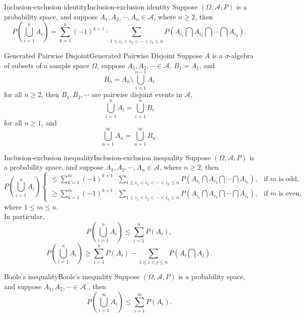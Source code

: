 \documentclass{elegantbook}
\newcommand\dis{\displaystyle}
\newcommand\ls{\leqslant}
\newcommand\gs{\geqslant}
\newcommand\sumin{\dis\sum\limits_{i=1}^{n}}
\newcommand\sumkfn{\dis\sum\limits_{k=1}^n}
\newcommand\ma{\mathcal{A}}
\begin{document}
\begin{theorem}{Inclusion-exclusion identity}{Inclusion-exclusion identity}
Suppose $(\Omega,\ma, P)$ is a probability space, and suppose $A_1,A_2,\cdots,A_n\in\ma $, where $n \gs2$, then $$P\left(\bigcup_{i=1}^n A_i \right)=\sumkfn(-1)^{k+1}\cdot  \sum_{1\ls i_1<i_2<\cdots<i_k\ls n}P\left(A_{i_1} \bigcap A_{i_2 } \bigcap\cdots\bigcap A_{i_k } \right) .$$

\end{theorem}

\begin{lemma}{Generated Pairwise Disjoint}{Generated Pairwise Disjoint}
Suppose $A$ is a $\sigma$-algebra of subsets of a sample space $\Omega$, suppose $A_1,A_2,\cdots\in\ma$, $B_1=A_1$, and $$B_n=A_n\setminus\bigcup_{i=1}^{n-1}A_i$$  for all $n\gs2$, then $B_1,B_2,\cdots$ are pairwise disjoint events in $\ma$, $$\bigcup_{i=1}^nA_i =\bigcup_{i=1}^nB_i$$  for all $n\gs1$, and $$\bigcup_{n=1}^\infty A_n =\bigcup_{n=1}^\infty B_n.$$

\end{lemma}

\begin{theorem}{Inclusion-exclusion inequality}{Inclusion-exclusion inequality}
Suppose $(\Omega,\ma, P)$ is a probability space, and suppose $A_1,A_2,\cdots,A_n\in\ma$, where $n\gs2$, then
$$P\left(\bigcup_{i=1}^n A_i \right)
\begin{cases}
\ls\sum\limits_{k=1}^m(-1)^{k+1}\cdot  \sum\limits_{1\ls i_1<i_2<\cdots<i_k\ls n}P\left(A_{i_1} \bigcap A_{i_2 } \bigcap\cdots\bigcap A_{i_k } \right),& \text{if $m$ is odd,}\\
\gs\sum\limits_{k=1}^m(-1)^{k+1}\cdot  \sum\limits_{1\ls i_1<i_2<\cdots<i_k\ls n}P\left(A_{i_1} \bigcap A_{i_2 } \bigcap\cdots\bigcap A_{i_k } \right),& \text{if $m$ is even,}
\end{cases}
$$
where $1\ls m\ls n$.\\
In particular,
$$P\left(\bigcup_{i=1}^n A_i \right)\ls\sumin P(A_i),$$
$$P\left(\bigcup_{i=1}^n A_i \right)\gs\sumin P(A_i)-
\sum\limits_{1\ls i<j\ls n}P\left(A_i\bigcap A_j\right).$$
\end{theorem}

\begin{theorem}{Boole's inequality}{Boole's inequality}
Suppose $(\Omega,\ma, P)$ is a probability space, and suppose $A_1,A_2,\cdots\in\ma$ , then 
$$P\left(\bigcup_{i=1}^\infty A_i \right)\ls\sum_{i=1}^\infty P(A_i ) .$$

\end{theorem}
\end{document}
